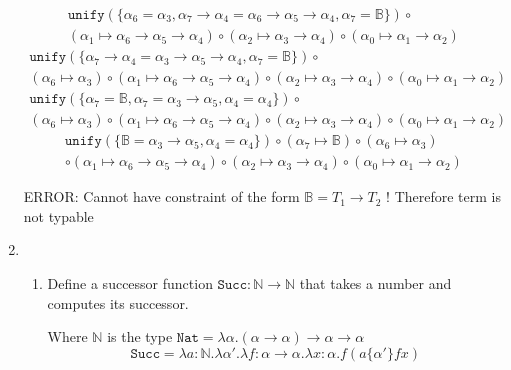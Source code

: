 \documentclass[11pt]{article}
\newcommand{\B}{\mathbb{B}}
\newcommand{\N}{\mathbb{N}}
\newcommand{\U}{\texttt{unify}}
\newcommand{\rarr}{\rightarrow}
\begin{document}
\begin{enumerate}
	\begin{multline}
		\U( \{ \alpha_6 = \alpha_3, \alpha_7 \rarr \alpha_4 = \alpha_6 \rarr \alpha_5 \rarr \alpha_4, \alpha_7 = \B \} ) \circ \\ ( \alpha_1 \mapsto \alpha_6 \rarr \alpha_5 \rarr \alpha_4) \circ ( \alpha_2 \mapsto \alpha_3 \rarr \alpha_4) \circ ( \alpha_0 \mapsto \alpha_1 \rarr \alpha_2) 
	\end{multline}
	\begin{multline}
		\U( \{ \alpha_7 \rarr \alpha_4 = \alpha_3 \rarr \alpha_5 \rarr \alpha_4, \alpha_7 = \B \}  ) \circ \\
		( \alpha_6 \mapsto \alpha_3) \circ  ( \alpha_1 \mapsto \alpha_6 \rarr \alpha_5 \rarr \alpha_4) \circ ( \alpha_2 \mapsto \alpha_3 \rarr \alpha_4) \circ ( \alpha_0 \mapsto \alpha_1 \rarr \alpha_2) 
	\end{multline}
	\begin{multline}
		\U( \{ \alpha_7 = \B, \alpha_7 = \alpha_3 \rarr \alpha_5, \alpha_4 = \alpha_4 \} ) \circ \\ 
			( \alpha_6 \mapsto \alpha_3) \circ  ( \alpha_1 \mapsto \alpha_6 \rarr \alpha_5 \rarr \alpha_4) \circ ( \alpha_2 \mapsto \alpha_3 \rarr \alpha_4) \circ ( \alpha_0 \mapsto \alpha_1 \rarr \alpha_2) 
	\end{multline}
	\begin{multline}
		\U( \{ \B = \alpha_3 \rarr \alpha_5, \alpha_4 = \alpha_4 \} ) \circ ( \alpha_7 \mapsto \B) \circ ( \alpha_6 \mapsto \alpha_3) \\
			\circ  ( \alpha_1 \mapsto \alpha_6 \rarr \alpha_5 \rarr \alpha_4) \circ ( \alpha_2 \mapsto \alpha_3 \rarr \alpha_4) \circ ( \alpha_0 \mapsto \alpha_1 \rarr \alpha_2) 
	\end{multline}

	\color{red}
	ERROR: Cannot have constraint of the form $\B = T_1 \rarr T_2$ ! Therefore term is not typable 

	\color{black}
\item 
	\begin{enumerate}

		\item 

			Define a successor function $ \texttt{Succ}: \N \rarr \N$ that takes a number and computes its successor.

			Where $\N$ is the type $ \texttt{Nat} = \lambda \alpha . ( \alpha \rarr \alpha) \rarr \alpha \rarr \alpha $
			\begin{equation*}
				\texttt{Succ} = \lambda a:\N. \lambda \alpha'. \lambda f: \alpha \rarr \alpha . \lambda x: \alpha . f(a \{ \alpha' \} fx)
			\end{equation*}


\end{enumerate}
\end{enumerate}
\end{document}
